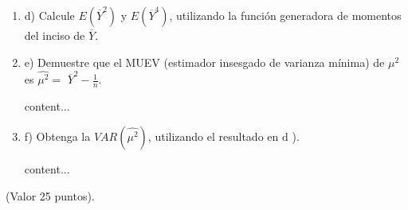 \begin{enumerate}
\begin{solution}
	\end{solution}
	\item d) Calcule $E\left(\overline{Y}^{2}\right)$ y $E\left(\overline{Y}^{4}\right)$, utilizando la función generadora de momentos del inciso de
	$\overline{Y}$.
    \item e) Demuestre que el MUEV (estimador insesgado de varianza mínima) de $\mu^{2}$ es $\widehat{\mu^{2}}=$ $\overline{Y}^{2}-\frac{1}{n}$. \begin{solution}
    	content...
    \end{solution}
	\item f) Obtenga la $V A R\left(\widehat{\mu^{2}}\right)$, utilizando el resultado en $\mathrm{d}$ ).
	\begin{solution}
		content...
	\end{solution} 
\end{enumerate}
(Valor 25 puntos).

